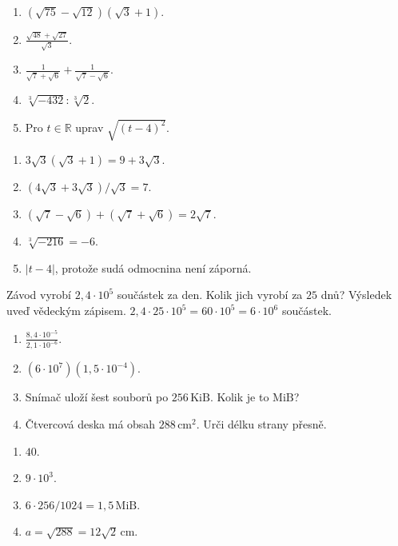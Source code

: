 \documentclass[11pt,a4paper]{article}
\begin{document}
\begin{zadaniReseniBox}[title={Samostatná práce 3},breakable=false]
\begin{enumerate}[label=\alph*)]
\item $(\sqrt{75}-\sqrt{12})(\sqrt3+1)$.
\item $\displaystyle\frac{\sqrt{48}+\sqrt{27}}{\sqrt3}$.
\item $\displaystyle\frac1{\sqrt7+\sqrt6}+\frac1{\sqrt7-\sqrt6}$.
\item $\displaystyle\sqrt[3]{-432}:\sqrt[3]{2}$.
\item Pro $t\in\mathbb R$ uprav $\sqrt{(t-4)^2}$.
\end{enumerate}
\tcblower
\begin{enumerate}[label=\alph*)]
\item $3\sqrt3(\sqrt3+1)=\boxed{9+3\sqrt3}$.
\item $(4\sqrt3+3\sqrt3)/\sqrt3=\boxed7$.
\item $(\sqrt7-\sqrt6)+(\sqrt7+\sqrt6)=\boxed{2\sqrt7}$.
\item $\sqrt[3]{-216}=\boxed{-6}$.
\item $\boxed{|t-4|}$, protože sudá odmocnina není záporná.
\end{enumerate}
\end{zadaniReseniBox}

\begin{prikladReseniBox}[title={Příklad 4},breakable=false]
Závod vyrobí $2{,}4\cdot10^5$ součástek za den.
Kolik jich vyrobí za $25$ dnů? Výsledek uveď vědeckým zápisem.
\tcblower
$2{,}4\cdot25\cdot10^5=60\cdot10^5=\boxed{6\cdot10^6}$ součástek.
\end{prikladReseniBox}

\begin{zadaniReseniBox}[title={Samostatná práce 4},breakable=false]
\begin{enumerate}[label=\alph*)]
\item $\displaystyle\frac{8{,}4\cdot10^{-5}}{2{,}1\cdot10^{-6}}$.
\item $\displaystyle(6\cdot10^7)(1{,}5\cdot10^{-4})$.
\item Snímač uloží šest souborů po $256\,\mathrm{KiB}$. Kolik je to $\mathrm{MiB}$?
\item Čtvercová deska má obsah $288\,\mathrm{cm}^2$. Urči délku strany přesně.
\end{enumerate}
\tcblower
\begin{enumerate}[label=\alph*)]
\item $\boxed{40}$.
\item $\boxed{9\cdot10^3}$.
\item $6\cdot256/1024=\boxed{1{,}5\,\mathrm{MiB}}$.
\item $a=\sqrt{288}=\boxed{12\sqrt2\,\mathrm{cm}}$.
\end{enumerate}
\end{zadaniReseniBox}
\end{document}
